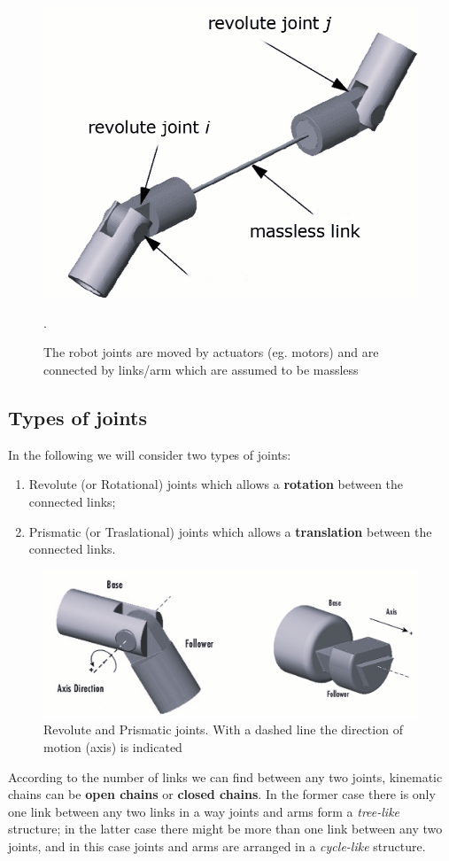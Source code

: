\begin{figure}
    \centering
    \includegraphics[scale=0.5]{img/joints_links.png}
    \caption{The robot joints are moved by actuators (eg. motors) and are connected by links/arm which are assumed to be massless}.
\end{figure}
\newpage
\subsection{Types of joints}
In the following we will consider two types of joints: 
\begin{enumerate}
    \itemsep-0.3em
    \item \textsf{Revolute (or Rotational) joints} which allows a \textbf{rotation} between the connected links; 
    \item \textsf{Prismatic (or Traslational) joints} which allows a \textbf{translation} between the connected links.
\end{enumerate}

\begin{figure}
    \centering
    \includegraphics[scale=0.5]{img/joints_tyeps.png}
    \caption{Revolute and Prismatic joints. With a dashed line the direction of motion (axis) is indicated}
\end{figure}
According to the number of links we can find between any two joints, kinematic chains can be \textbf{open chains} or \textbf{closed chains}. In the former case there is only one link between any two links in a way joints and arms form a \textit{tree-like} structure; in the latter case there might be more than one link between any two joints, and in this case joints and arms are arranged in a \textit{cycle-like} structure.

